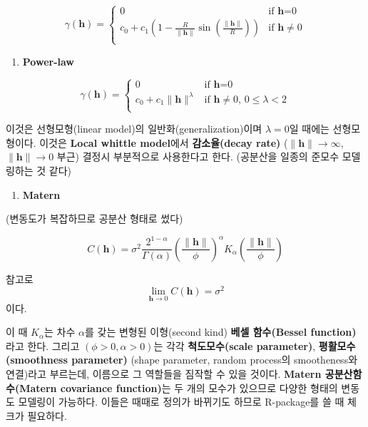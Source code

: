 \documentclass[b5paper,]{scrbook}
\providecommand{\tightlist}{%
  \setlength{\itemsep}{0pt}\setlength{\parskip}{0pt}}
\theoremstyle{plain}
\theoremstyle{definition}
\numberwithin{equation}{section}
\begin{document}
\[
\gamma(\mathbf{h})= \left\{ \begin{array}{ll}
0 & \textrm{if $\mathbf{h}$=0}\\
c_{0}+c_{1}(1-\frac{R}{\|\mathbf{h}\|}\sin(\frac{\|\mathbf{h}\|}{R})) & \textrm{if $\mathbf{h}\neq 0$}\\
\end{array} \right.
\]

\begin{enumerate}
\def\labelenumi{\arabic{enumi}.}
\setcounter{enumi}{7}
\tightlist
\item
  \textbf{Power-law}
\end{enumerate}

\[
\gamma(\mathbf{h})= \left\{ \begin{array}{ll}
0 & \textrm{if $\mathbf{h}$=0}\\
c_{0}+c_{1}\| \mathbf{h}\|^{\lambda} & \textrm{if $\mathbf{h}\neq 0$, $0\leq \lambda < 2$}\\
\end{array} \right.
\]

이것은 선형모형(linear model)의 일반화(generalization)이며
\(\lambda=0\)일 때에는 선형모형이다. 이것은 \textbf{Local whittle
model}에서 \textbf{감소율(decay rate)}
(\(\| \mathbf{h} \| \rightarrow \infty\),
\(\| \mathbf{h} \| \rightarrow 0\) 부근) 결정시 부분적으로 사용한다고
한다. (공분산을 일종의 준모수 모델링하는 것 같다)

\begin{enumerate}
\def\labelenumi{\arabic{enumi}.}
\setcounter{enumi}{8}
\tightlist
\item
  \textbf{Matern}
\end{enumerate}

(변동도가 복잡하므로 공분산 형태로 썼다)

\[C(\mathbf{h})=\sigma^{2}\frac{2^{1-\alpha}}{\Gamma(\alpha)}(\frac{\|\mathbf{h}\|}{\phi})^{\alpha}K_{\alpha}(\frac{\|\mathbf{h}\|}{\phi})\]

참고로 \[\lim_{\mathbf{h} \rightarrow 0}C(\mathbf{h}) = \sigma^{2}\]
이다.

이 때 \(K_{\alpha}\)는 차수 \(\alpha\)를 갖는 변형된 이형(second kind)
\textbf{베셀 함수(Bessel function)}라고 한다. 그리고
\((\phi>0,\alpha>0)\)는 각각 \textbf{척도모수(scale parameter)},
\textbf{평활모수(smoothness parameter)} (shape parameter, random
process의 smootheness와 연결)라고 부르는데, 이름으로 그 역할들을 짐작할
수 있을 것이다. \textbf{Matern 공분산함수(Matern covariance function)}는
두 개의 모수가 있으므로 다양한 형태의 변동도 모델링이 가능하다. 이들은
때때로 정의가 바뀌기도 하므로 R-package를 쓸 때 체크가 필요하다.
\end{document}
